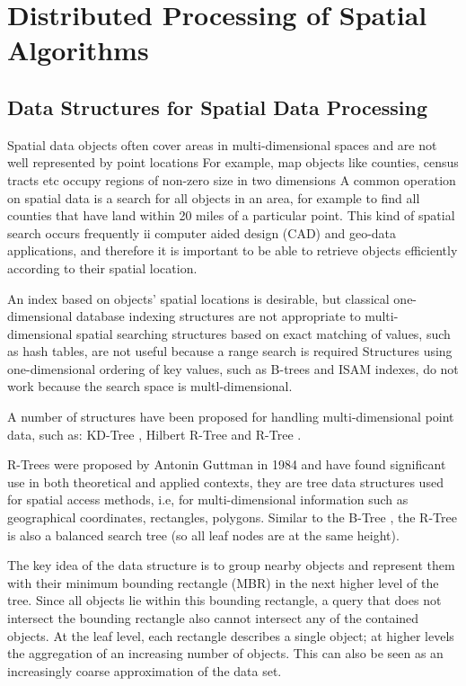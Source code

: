 \section{Distributed Processing of Spatial Algorithms}
\label{sec:spatial_dist}

\subsection{Data Structures for Spatial Data Processing}

	Spatial data objects often cover areas in multi-dimensional spaces and are not well represented by point locations For example, map objects like counties, census  tracts etc occupy regions of non-zero size  in two dimensions A common operation on spatial data is a search for all objects in an area, for example to find all counties that have land within 20 miles of a particular point. This kind of spatial search occurs frequently ii computer aided design (CAD) and geo-data applications, and therefore it is important to be able to retrieve objects efficiently according to their spatial location. 
	
	An index based on objects' spatial locations is desirable, but classical one-dimensional database indexing structures are not appropriate to multi-dimensional spatial searching structures based on exact matching of values, such as hash tables, are not useful because a range search is required Structures using one-dimensional ordering of key values, such as B-trees and ISAM indexes, do not work because the search space is multl-dimensional. 
		
	A number of structures have been proposed for handling multi-dimensional point data, such as: KD-Tree \cite{bentley1975multidimensional}, Hilbert R-Tree \cite{kamel1994hilbert} and R-Tree \cite{guttman1984r}.
	
	R-Trees were proposed by Antonin Guttman in 1984 and have found significant use in both theoretical and applied contexts, they are tree data structures used for spatial access methods, i.e, for multi-dimensional information such as geographical coordinates, rectangles, polygons. Similar to the B-Tree \cite{comer1979ubiquitous}, the R-Tree is also a balanced search tree (so all leaf nodes are at the same height).

	The key idea of the data structure is to group nearby objects and represent them with their minimum bounding rectangle (MBR) in the next higher level of the tree. Since all objects lie within this bounding rectangle, a query that does not intersect the bounding rectangle also cannot intersect any of the contained objects. At the leaf level, each rectangle describes a single object; at higher levels the aggregation of an increasing number of objects. This can also be seen as an increasingly coarse approximation of the data set.

